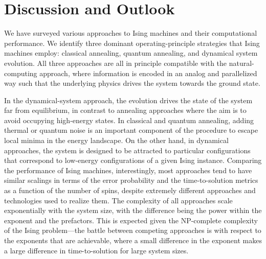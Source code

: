 \documentclass[fleqn,10pt]{wlscirep}
\def\fromNM#1{{\color{blue}\small{\bf } {\em #1}}}
\begin{document}


\section*{Discussion and Outlook}

We have surveyed various approaches to Ising machines and their computational performance.  We identify three dominant operating-principle strategies that Ising machines employ: classical annealing, quantum annealing, and dynamical system evolution.  All three approaches are all in principle compatible with the natural-computing approach, where information is encoded in an analog and parallelized way such that the underlying physics drives the system towards the ground state.  


In the dynamical-system approach, the evolution drives the state of the system far from equilibrium, in contrast to annealing approaches where the aim is to avoid occupying high-energy states.  In classical and quantum annealing, adding thermal or quantum noise is an important component of the procedure to escape local minima in the energy landscape.  On the other hand, in dynamical approaches, the system is designed to be attracted to particular configurations that correspond to low-energy configurations of a given Ising instance. Comparing the performance of Ising machines, interestingly, most approaches tend to have similar scalings in terms of the error probability and the time-to-solution metrics as a function of the number of spins, despite extremely different approaches and technologies used to realize them.  The complexity of all approaches scale exponentially with the system size, with the difference being the power within the exponent and the prefactors. This is expected given the NP-complete complexity of the Ising problem---the battle between competing approaches is with respect to the exponents that are achievable, where a small difference in the exponent makes a large difference in time-to-solution for large system sizes. 
\end{document}
